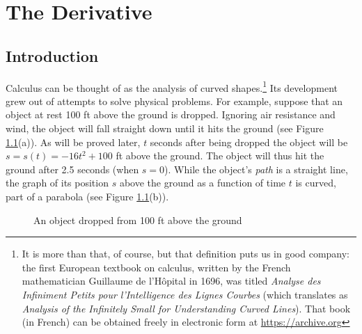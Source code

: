 \chapter{The Derivative}
\section{Introduction}
Calculus can be thought of as the analysis of curved shapes.\footnote{It is more
than that, of course, but that definition puts us in good company:
the first European textbook on calculus, written by the French mathematician
Guillaume de l'H\^{o}pital in 1696, was titled \emph{Analyse des Infiniment
Petits pour l'Intelligence des Lignes Courbes} (which translates as
\emph{Analysis of the Infinitely Small for Understanding Curved Lines}). That
book (in French) can be obtained freely in electronic form at
\url{https://archive.org}}
Its development grew out of attempts to solve physical problems.
For example, suppose that an object at rest 100 ft above the ground is dropped.
Ignoring air resistance and wind, the object will fall straight down until it
hits the ground (see Figure \ref{fig:fall}(a)). As will be proved later,
$t$ seconds after being dropped the object will be
$s = s(t) = -16t^2 + 100$ ft above the ground. The object will thus hit
the ground after 2.5 seconds (when $s = 0$). While the object's \emph{path} is a
straight line, the graph of its position $s$ above the ground as a function of
time $t$ is curved, part of a parabola (see Figure \ref{fig:fall}(b)).

\begin{figure}[ht]
 \centering
 \qquad\qquad
 \caption[]{\quad An object dropped from 100 ft above the ground}
 \label{fig:fall}
\end{figure}

